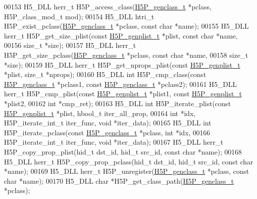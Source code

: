 \begin{DoxyCode}
00153 H5\_DLL herr\_t H5P\_access\_class(\hyperlink{struct_h5_p__genclass__t}{H5P\_genclass\_t} *pclass, H5P\_class\_mod\_t mod);
00154 H5\_DLL htri\_t H5P\_exist\_pclass(\hyperlink{struct_h5_p__genclass__t}{H5P\_genclass\_t} *pclass, \textcolor{keyword}{const} \textcolor{keywordtype}{char} *name);
00155 H5\_DLL herr\_t H5P\_get\_size\_plist(\textcolor{keyword}{const} \hyperlink{struct_h5_p__genplist__t}{H5P\_genplist\_t} *plist, \textcolor{keyword}{const} \textcolor{keywordtype}{char} *name,
00156     \textcolor{keywordtype}{size\_t} *size);
00157 H5\_DLL herr\_t H5P\_get\_size\_pclass(\hyperlink{struct_h5_p__genclass__t}{H5P\_genclass\_t} *pclass, \textcolor{keyword}{const} \textcolor{keywordtype}{char} *name,
00158     \textcolor{keywordtype}{size\_t} *size);
00159 H5\_DLL herr\_t H5P\_get\_nprops\_plist(\textcolor{keyword}{const} \hyperlink{struct_h5_p__genplist__t}{H5P\_genplist\_t} *plist, \textcolor{keywordtype}{size\_t} *nprops);
00160 H5\_DLL \textcolor{keywordtype}{int} H5P\_cmp\_class(\textcolor{keyword}{const} \hyperlink{struct_h5_p__genclass__t}{H5P\_genclass\_t} *pclass1, \textcolor{keyword}{const} 
      \hyperlink{struct_h5_p__genclass__t}{H5P\_genclass\_t} *pclass2);
00161 H5\_DLL herr\_t H5P\_cmp\_plist(\textcolor{keyword}{const} \hyperlink{struct_h5_p__genplist__t}{H5P\_genplist\_t} *plist1, \textcolor{keyword}{const} 
      \hyperlink{struct_h5_p__genplist__t}{H5P\_genplist\_t} *plist2,
00162     \textcolor{keywordtype}{int} *cmp\_ret);
00163 H5\_DLL \textcolor{keywordtype}{int} H5P\_iterate\_plist(\textcolor{keyword}{const} \hyperlink{struct_h5_p__genplist__t}{H5P\_genplist\_t} *plist, hbool\_t iter\_all\_prop,
00164     \textcolor{keywordtype}{int} *idx, H5P\_iterate\_int\_t iter\_func, \textcolor{keywordtype}{void} *iter\_data);
00165 H5\_DLL \textcolor{keywordtype}{int} H5P\_iterate\_pclass(\textcolor{keyword}{const} \hyperlink{struct_h5_p__genclass__t}{H5P\_genclass\_t} *pclass, \textcolor{keywordtype}{int} *idx,
00166     H5P\_iterate\_int\_t iter\_func, \textcolor{keywordtype}{void} *iter\_data);
00167 H5\_DLL herr\_t H5P\_copy\_prop\_plist(hid\_t dst\_id, hid\_t src\_id, \textcolor{keyword}{const} \textcolor{keywordtype}{char} *name);
00168 H5\_DLL herr\_t H5P\_copy\_prop\_pclass(hid\_t dst\_id, hid\_t src\_id, \textcolor{keyword}{const} \textcolor{keywordtype}{char} *name);
00169 H5\_DLL herr\_t H5P\_unregister(\hyperlink{struct_h5_p__genclass__t}{H5P\_genclass\_t} *pclass, \textcolor{keyword}{const} \textcolor{keywordtype}{char} *name);
00170 H5\_DLL \textcolor{keywordtype}{char} *H5P\_get\_class\_path(\hyperlink{struct_h5_p__genclass__t}{H5P\_genclass\_t} *pclass);

\end{DoxyCode}
